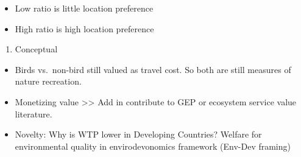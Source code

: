 \documentclass[
  letterpaper,
]{article}
\providecommand{\tightlist}{%
  \setlength{\itemsep}{0pt}\setlength{\parskip}{0pt}}\usepackage{longtable,booktabs,array}
\begin{document}
\begin{tcolorbox}
\begin{itemize}
  \begin{itemize}
  \tightlist
  \item
    Low ratio is little location preference
  \item
    High ratio is high location preference
  \end{itemize}
\end{itemize}

\begin{enumerate}
\def\labelenumi{\arabic{enumi}.}
\setcounter{enumi}{5}
\tightlist
\item
  Conceptual
\end{enumerate}

\begin{itemize}
\tightlist
\item
  Birds vs.~non-bird still valued as travel cost. So both are still
  measures of nature recreation.
\item
  Monetizing value \textgreater\textgreater{} Add in contribute to GEP
  or ecosystem service value literature.
\item
  Novelty: Why is WTP lower in Developing Countries? Welfare for
  environmental quality in envirodevonomics framework (Env-Dev framing)
\end{itemize}

\end{tcolorbox}
\end{document}
